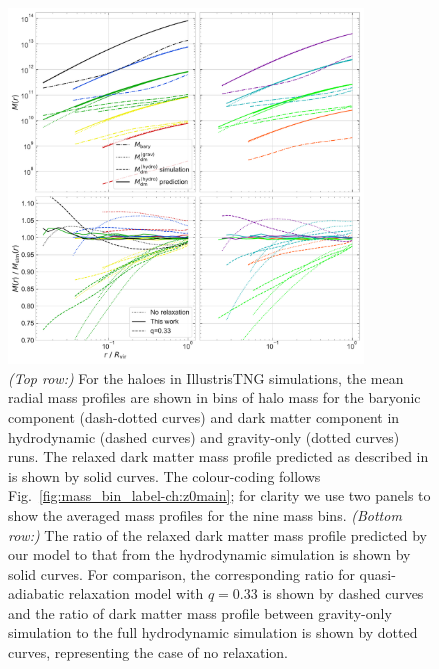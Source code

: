 \begin{figure}[htbp]
    \centering
    \includegraphics[width=0.84\textwidth]{plots/Mass-prof_with_demo_accu-1.pdf}
    \caption{\emph{(Top row:)} For the haloes in IllustrisTNG simulations, the mean radial mass profiles are shown in bins of halo mass for the baryonic component (dash-dotted curves) and dark matter component in hydrodynamic (dashed curves) and gravity-only (dotted curves) runs.  The relaxed dark matter mass profile predicted as described in  is shown by solid curves. The colour-coding follows Fig.~\ref{fig:mass_bin_label-ch:z0main}; for clarity we use two panels to show the averaged mass profiles for the nine mass bins. 
    \emph{(Bottom row:)} The ratio of the relaxed dark matter mass profile predicted by our model to that from the hydrodynamic simulation is shown by solid curves. For comparison, the corresponding ratio for quasi-adiabatic relaxation model with $q=0.33$ is shown by dashed curves and the ratio of dark matter mass profile between gravity-only simulation to the full hydrodynamic simulation is shown by dotted curves, representing the case of no relaxation. } 
    \label{fig:demo-fit-ch:z0main}
\end{figure}

